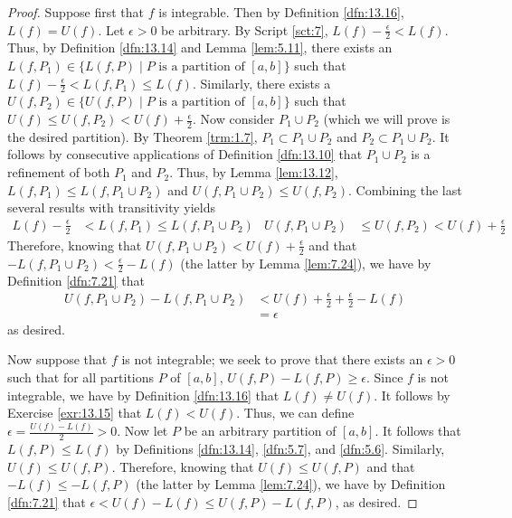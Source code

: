 \documentclass[../main.tex]{subfiles}
\begin{document}
\begin{theorem}
\begin{proof}
        Suppose first that $f$ is integrable. Then by Definition \ref{dfn:13.16}, $L(f)=U(f)$. Let $\epsilon>0$ be arbitrary. By Script \ref{sct:7}, $L(f)-\frac{\epsilon}{2}<L(f)$. Thus, by Definition \ref{dfn:13.14} and Lemma \ref{lem:5.11}, there exists an $L(f,P_1)\in\{L(f,P)\mid P\text{ is a partition of }[a,b]\}$ such that $L(f)-\frac{\epsilon}{2}<L(f,P_1)\leq L(f)$. Similarly, there exists a $U(f,P_2)\in\{U(f,P)\mid P\text{ is a partition of }[a,b]\}$ such that $U(f)\leq U(f,P_2)<U(f)+\frac{\epsilon}{2}$. Now consider $P_1\cup P_2$ (which we will prove is the desired partition). By Theorem \ref{trm:1.7}, $P_1\subset P_1\cup P_2$ and $P_2\subset P_1\cup P_2$. It follows by consecutive applications of Definition \ref{dfn:13.10} that $P_1\cup P_2$ is a refinement of both $P_1$ and $P_2$. Thus, by Lemma \ref{lem:13.12}, $L(f,P_1)\leq L(f,P_1\cup P_2)$ and $U(f,P_1\cup P_2)\leq U(f,P_2)$. Combining the last several results with transitivity yields
        \begin{align*}
            L(f)-\frac{\epsilon}{2} &< L(f,P_1) \leq L(f,P_1\cup P_2)&
            U(f,P_1\cup P_2) &\leq U(f,P_2) < U(f)+\frac{\epsilon}{2}
        \end{align*}
        Therefore, knowing that $U(f,P_1\cup P_2)<U(f)+\frac{\epsilon}{2}$ and that $-L(f,P_1\cup P_2)<\frac{\epsilon}{2}-L(f)$ (the latter by Lemma \ref{lem:7.24}), we have by Definition \ref{dfn:7.21} that
        \begin{align*}
            U(f,P_1\cup P_2)-L(f,P_1\cup P_2) &< U(f)+\frac{\epsilon}{2}+\frac{\epsilon}{2}-L(f)\\
            &= \epsilon
        \end{align*}
        as desired.\par
        Now suppose that $f$ is not integrable; we seek to prove that there exists an $\epsilon>0$ such that for all partitions $P$ of $[a,b]$, $U(f,P)-L(f,P)\geq\epsilon$. Since $f$ is not integrable, we have by Definition \ref{dfn:13.16} that $L(f)\neq U(f)$. It follows by Exercise \ref{exr:13.15} that $L(f)<U(f)$. Thus, we can define $\epsilon=\frac{U(f)-L(f)}{2}>0$. Now let $P$ be an arbitrary partition of $[a,b]$. It follows that $L(f,P)\leq L(f)$ by Definitions \ref{dfn:13.14}, \ref{dfn:5.7}, and \ref{dfn:5.6}. Similarly, $U(f)\leq U(f,P)$. Therefore, knowing that $U(f)\leq U(f,P)$ and that $-L(f)\leq -L(f,P)$ (the latter by Lemma \ref{lem:7.24}), we have by Definition \ref{dfn:7.21} that $\epsilon<U(f)-L(f)\leq U(f,P)-L(f,P)$, as desired.
    \end{proof}
\end{theorem}
\end{document}

